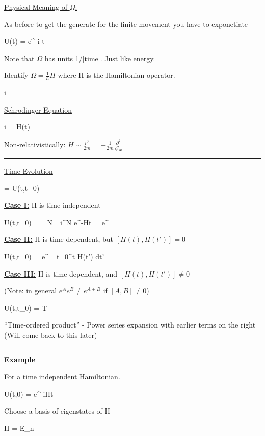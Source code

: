 {\underline{Physical Meaning of $\Omega$:}

As before to get the generate for the finite movement you have to exponetiate

\be
U(t) = e^{-i \Omega t}
\ee

Note that $\Omega$ has units 1/[time].  
Just like energy.

Identify $\Omega = \frac{1}{\hbar}H$  where H is the Hamiltonian operator.


\be
i \ket{\psi} = \Omega \ket{\psi} =  \ket{\psi}
\ee


\underline{Schrodinger Equation}

\be
i \ket{\psi} = H(t) \ket{\psi}
\ee

Non-relativistically:  $H \sim \frac{p^2}{2m} = -\frac{1}{2m} \frac{\partial^2}{\partial^2 x}$

\noindent\rule{\textwidth}{1pt}

\underline{Time Evolution}

\be
{} = U(t,t_0) 
\ee


\textbf{\underline{Case I:}} H is time independent

\be
U(t,t_0) = \lim_{N\rightarrow\infty} \prod\limits_{i}^{N} e^{-H\Delta t}  = e^{}
\ee


\textbf{\underline{Case II:}} H is time dependent, but $[H(t), H(t')] = 0$

\be
U(t,t_0) =  e^{ \int_{t_0}^{t} H(t') dt'}
\ee


\textbf{\underline{Case III:}} H is time dependent, and $[H(t), H(t')] \ne 0$

(Note: in general $e^A e^B \ne e^{A+B}$ if $[A,B] \ne 0$)

\be
U(t,t_0) =  T 
\ee

``Time-ordered product'' - Power series expansion with earlier terms on the right
(Will come back to this later)


\noindent\rule{\textwidth}{1pt}

\textbf{\underline{Example}}

For a time \underline{independent} Hamiltonian.

\be
U(t,0) = e^{-iHt}
\ee

Choose a basis of eigenstates of H

\be
H = E_n
\ee

}
